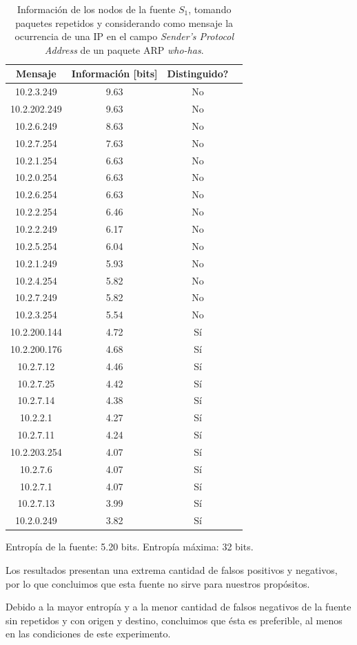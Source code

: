 \begin{table}[t]
    \centering
    \begin{tabular}{ | c | c | c | l |}
        \hline
        Mensaje & Información [bits] & Distinguido?\\
\hline
10.2.3.249 & 9.63 & No \\
\hline
10.2.202.249 & 9.63 & No \\
\hline
10.2.6.249 & 8.63 & No \\
\hline
10.2.7.254 & 7.63 & No \\
\hline
10.2.1.254 & 6.63 & No \\
\hline
10.2.0.254 & 6.63 & No \\
\hline
10.2.6.254 & 6.63 & No \\
\hline
10.2.2.254 & 6.46 & No \\
\hline
10.2.2.249 & 6.17 & No \\
\hline
10.2.5.254 & 6.04 & No \\
\hline
10.2.1.249 & 5.93 & No \\
\hline
10.2.4.254 & 5.82 & No \\
\hline
10.2.7.249 & 5.82 & No \\
\hline
10.2.3.254 & 5.54 & No \\
\hline
10.2.200.144 & 4.72 & Sí \\
\hline
10.2.200.176 & 4.68 & Sí \\
\hline
10.2.7.12 & 4.46 & Sí \\
\hline
10.2.7.25 & 4.42 & Sí \\
\hline
10.2.7.14 & 4.38 & Sí \\
\hline
10.2.2.1 & 4.27 & Sí \\
\hline
10.2.7.11 & 4.24 & Sí \\
\hline
10.2.203.254 & 4.07 & Sí \\
\hline
10.2.7.6 & 4.07 & Sí \\
\hline
10.2.7.1 & 4.07 & Sí \\
\hline
10.2.7.13 & 3.99 & Sí \\
\hline
10.2.0.249 & 3.82 & Sí \\
\hline
    \end{tabular} 
    \caption{Información de los nodos de la fuente $S_1$, tomando paquetes repetidos y considerando como mensaje la ocurrencia de una IP en el campo \textit{Sender's Protocol Address} de un paquete ARP \textit{who-has}.}
    \label{tab1R}
\end{table} 

\par Entropía de la fuente: 5.20 bits. Entropía máxima: 32 bits.

\par Los resultados presentan una extrema cantidad de falsos positivos y negativos, por lo que concluimos que esta fuente no sirve para nuestros propósitos.

\par Debido a la mayor entropía y a la menor cantidad de falsos negativos de la fuente sin repetidos y con origen y destino, concluimos que ésta es preferible, al menos en las condiciones de este experimento.

